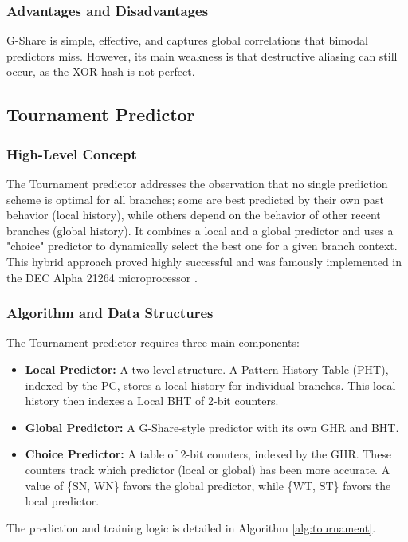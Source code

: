 \documentclass[sigconf, screen]{acmart}
\begin{document}
\subsubsection{Advantages and Disadvantages}
G-Share is simple, effective, and captures global correlations that bimodal predictors miss. However, its main weakness is that destructive aliasing can still occur, as the XOR hash is not perfect.

\subsection{Tournament Predictor}

\subsubsection{High-Level Concept}
The Tournament predictor \cite{mcfarling1993combining} addresses the observation that no single prediction scheme is optimal for all branches; some are best predicted by their own past behavior (local history), while others depend on the behavior of other recent branches (global history). It combines a local and a global predictor and uses a "choice" predictor to dynamically select the best one for a given branch context. This hybrid approach proved highly successful and was famously implemented in the DEC Alpha 21264 microprocessor \cite{kessler1999alpha}.

\subsubsection{Algorithm and Data Structures}
The Tournament predictor requires three main components:
\begin{itemize}
    \item \textbf{Local Predictor:} A two-level structure. A Pattern History Table (PHT), indexed by the PC, stores a local history for individual branches. This local history then indexes a Local BHT of 2-bit counters.
    \item \textbf{Global Predictor:} A G-Share-style predictor with its own GHR and BHT.
    \item \textbf{Choice Predictor:} A table of 2-bit counters, indexed by the GHR. These counters track which predictor (local or global) has been more accurate. A value of \{SN, WN\} favors the global predictor, while \{WT, ST\} favors the local predictor.
\end{itemize}
The prediction and training logic is detailed in Algorithm \ref{alg:tournament}.
\end{document}
